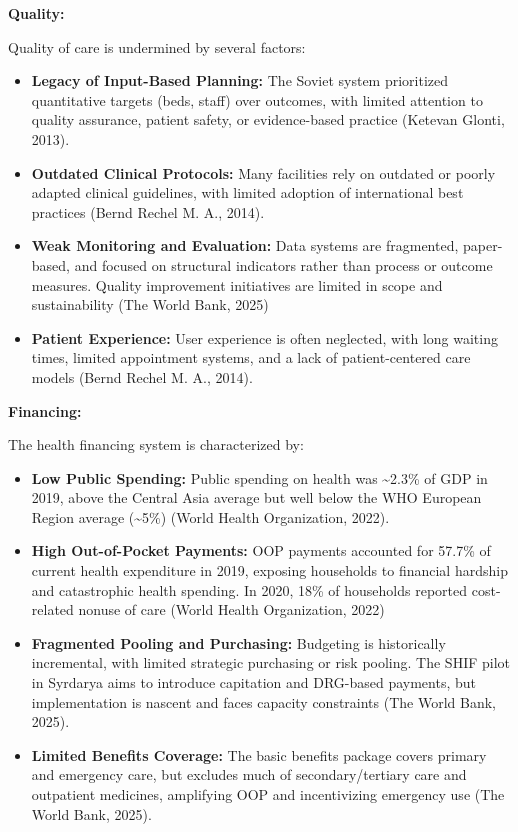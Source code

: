 \textbf{Quality:}

Quality of care is undermined by several factors:

\begin{itemize}
\item
  \textbf{Legacy of Input-Based Planning:} The Soviet system prioritized
  quantitative targets (beds, staff) over outcomes, with limited
  attention to quality assurance, patient safety, or evidence-based
  practice (Ketevan Glonti, 2013).
\item
  \textbf{Outdated Clinical Protocols:} Many facilities rely on outdated
  or poorly adapted clinical guidelines, with limited adoption of
  international best practices (Bernd Rechel M. A., 2014).
\item
  \textbf{Weak Monitoring and Evaluation:} Data systems are fragmented,
  paper-based, and focused on structural indicators rather than process
  or outcome measures. Quality improvement initiatives are limited in
  scope and sustainability (The World Bank, 2025)
\item
  \textbf{Patient Experience:} User experience is often neglected, with
  long waiting times, limited appointment systems, and a lack of
  patient-centered care models (Bernd Rechel M. A., 2014).
\end{itemize}

\textbf{Financing:}

The health financing system is characterized by:

\begin{itemize}
\item
  \textbf{Low Public Spending:} Public spending on health was
  \textasciitilde2.3\% of GDP in 2019, above the Central Asia average
  but well below the WHO European Region average (\textasciitilde5\%)
  (World Health Organization, 2022).
\item
  \textbf{High Out-of-Pocket Payments:} OOP payments accounted for
  57.7\% of current health expenditure in 2019, exposing households to
  financial hardship and catastrophic health spending. In 2020, 18\% of
  households reported cost-related nonuse of care (World Health
  Organization, 2022)
\item
  \textbf{Fragmented Pooling and Purchasing:} Budgeting is historically
  incremental, with limited strategic purchasing or risk pooling. The
  SHIF pilot in Syrdarya aims to introduce capitation and DRG-based
  payments, but implementation is nascent and faces capacity constraints
  (The World Bank, 2025).
\item
  \textbf{Limited Benefits Coverage:} The basic benefits package covers
  primary and emergency care, but excludes much of secondary/tertiary
  care and outpatient medicines, amplifying OOP and incentivizing
  emergency use (The World Bank, 2025).
\end{itemize}

